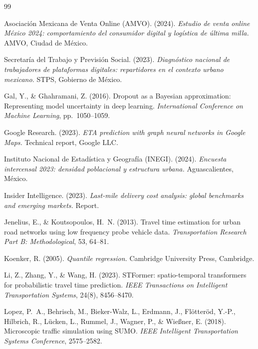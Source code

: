 \documentclass[11pt,a4paper]{article}
\begin{document}
\begin{thebibliography}{99}

Asociación Mexicana de Venta Online (AMVO). (2024).
\emph{Estudio de venta online México 2024: comportamiento del
consumidor digital y logística de última milla.} AMVO, Ciudad de
México.

Secretaría del Trabajo y Previsión Social. (2023).
\emph{Diagnóstico nacional de trabajadores de plataformas
digitales: repartidores en el contexto urbano mexicano.}
STPS, Gobierno de México.

Gal, Y., \& Ghahramani, Z. (2016). Dropout as a Bayesian
approximation: Representing model uncertainty in deep learning.
\emph{International Conference on Machine Learning},
pp.~\num{1050}--\num{1059}.

Google Research. (2023). \emph{ETA prediction with graph neural
networks in Google Maps.} Technical report, Google LLC.

Instituto Nacional de Estadística y Geografía (INEGI). (2024).
\emph{Encuesta intercensal 2023: densidad poblacional y
estructura urbana.} Aguascalientes, México.

Insider Intelligence. (2023). \emph{Last-mile delivery cost
analysis: global benchmarks and emerging markets.} Report.

Jenelius, E., \& Koutsopoulos, H.~N. (2013). Travel time
estimation for urban road networks using low frequency probe
vehicle data. \emph{Transportation Research Part B:
Methodological}, \num{53}, \num{64}--\num{81}.

Koenker, R. (2005). \emph{Quantile regression.} Cambridge
University Press, Cambridge.

Li, Z., Zhang, Y., \& Wang, H. (2023). STFormer: spatio-temporal
transformers for probabilistic travel time prediction.
\emph{IEEE Transactions on Intelligent Transportation Systems},
\num{24}(\num{8}), \num{8456}--\num{8470}.

Lopez, P.~A., Behrisch, M., Bieker-Walz, L., Erdmann, J.,
Flötteröd, Y.-P., Hilbrich, R., Lücken, L., Rummel, J., Wagner,
P., \& Wießner, E. (2018). Microscopic traffic simulation using
SUMO. \emph{IEEE Intelligent Transportation Systems Conference},
\num{2575}--\num{2582}.


\end{thebibliography}
\end{document}
